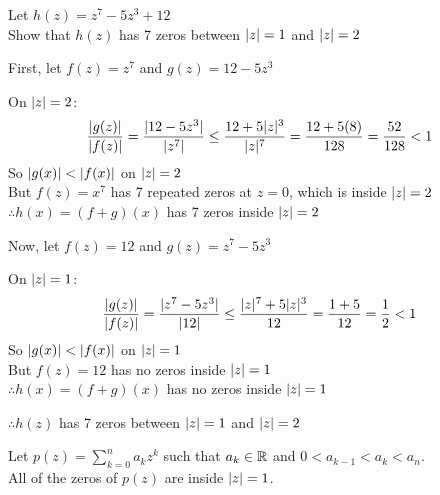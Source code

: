 \documentclass[letterpaper,12pt,fleqn]{article}
\begin{document}
\begin{example}
  Let $h(z)=z^7-5z^3+12$ \\
  Show that $h(z)$ has 7 zeros between $\lvert z\rvert=1$ and $\lvert z\rvert=2$

  First, let $f(z)=z^7$ and $g(z)=12-5z^3$

  On $\lvert z\rvert=2$:
  \[\frac{\lvert g(z)\rvert}{\lvert f(z)\rvert}=
  \frac{\lvert12-5z^3\rvert}{\lvert z^7\rvert}\le
  \frac{12+5\lvert z\rvert^3}{\lvert z\rvert^7}=
  \frac{12+5(8)}{128}=\frac{52}{128}<1\]
  So $\lvert g(x)\rvert<\lvert f(x)\rvert$ on $\lvert z\rvert=2$ \\
  But $f(z)=x^7$ has 7 repeated zeros at $z=0$, which is inside $\lvert z\rvert=2$ \\
  $\therefore h(x)=(f+g)(x)$ has 7 zeros inside $\lvert z\rvert=2$

  Now, let $f(z)=12$ and $g(z)=z^7-5z^3$

  On $\lvert z\rvert=1$:
  \[\frac{\lvert g(z)\rvert}{\lvert f(z)\rvert}=
  \frac{\lvert z^7-5z^3\rvert}{\lvert12\rvert}\le
  \frac{\lvert z\rvert^7+5\lvert z\rvert^3}{12}=
  \frac{1+5}{12}=\frac{1}{2}<1\]
  So $\lvert g(x)\rvert<\lvert f(x)\rvert$ on $\lvert z\rvert=1$ \\
  But $f(z)=12$ has no zeros inside $\lvert z\rvert=1$ \\
  $\therefore h(x)=(f+g)(x)$ has no zeros inside $\lvert z\rvert=1$

  $\therefore h(z)$ has 7 zeros between $\lvert z\rvert=1$ and $\lvert z\rvert=2$
\end{example}

\begin{theorem}[Enestome]
  Let $p(z)=\sum_{k=0}^na_kz^k$ such that $a_k\in\mathbb{R}$ and $0<a_{k-1}<a_k<a_n$. \\
  All of the zeros of $p(z)$ are inside $\lvert z\rvert=1$.
\end{theorem}
\end{document}
